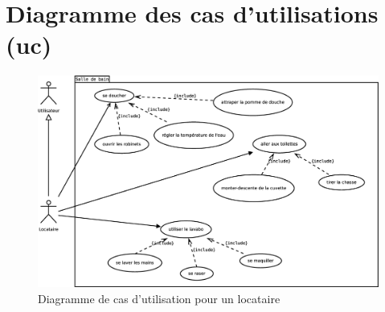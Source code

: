 \chapter{Diagramme des cas d'utilisations (uc)}
\begin{figure}
	\centering
	\includegraphics[width=1\linewidth]{diagrams/bathroom/diagramme_cas_utilisation_uc.eps}
	\caption{Diagramme de cas d'utilisation pour un locataire}
	\label{fig:diagramme_cas_utilisation_uc}
\end{figure}
